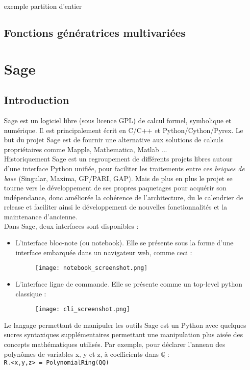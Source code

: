 \documentclass[12pt]{article}
\begin{document}
exemple partition d'entier
\subsection{Fonctions génératrices multivariées}

\section{Sage}

\subsection{Introduction}
Sage est un logiciel libre (sous licence GPL) de calcul formel, symbolique et
numérique. Il est principalement écrit en C/C++ et Python/Cython/Pyrex. Le but
du projet Sage est de fournir une alternative aux solutions de calculs
propriétaires comme Mapple, Mathematica, Matlab ... \\
Historiquement Sage est un regroupement de différents projets libres autour
d'une interface Python unifiée, pour faciliter les traitements entre ces
\emph{briques de base} (Singular, Maxima, GP/PARI, GAP). Mais de plus en plus
le projet se tourne vers le développement de ses propres paquetages pour
acquérir son indépendance, donc améliorée la cohérence de l'architecture, 
du le calendrier de release et faciliter ainsi le développement de nouvelles
fonctionnalités et la maintenance d'ancienne.\\
Dans Sage, deux interfaces sont disponibles :
\begin{itemize}
\item L'interface bloc-note (ou notebook). Elle se présente sous la forme
 d'une interface embarquée dans un navigateur web, comme ceci :
\begin{figure}[h]
\texttt{[image: notebook\_screenshot.png]}
\end{figure}
\item L'interface ligne de commande. Elle se présente comme un top-level
  python classique :
\begin{figure}[!h]
\texttt{[image: cli\_screenshot.png]}
\end{figure}
\end{itemize}

Le langage permettant de manipuler les outils Sage est un Python avec quelques sucres
syntaxiques supplémentaires permettant une manipulation plus aisée des
concepts mathématiques utilisés. Par exemple, pour déclarer l'anneau des
polynômes de variables x, y et z, à coefficients dans $\mathbb{Q}$ : \\
\verb|R.<x,y,z> = PolynomialRing(QQ)|
\end{document}
